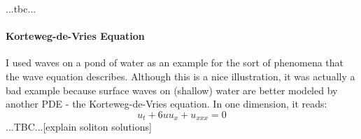 







 ...tbc...



\paragraph{Korteweg-de-Vries Equation}
I used waves on a pond of water as an example for the sort of phenomena that the wave equation describes. Although this is a nice illustration, it was actually a bad example because surface waves on (shallow) water are better modeled by another PDE - the Korteweg-de-Vries equation. In one dimension, it reads:
\begin{equation}
 u_t + 6 u u_x + u_{xxx} = 0
\end{equation}
...TBC...[explain soliton solutions]

